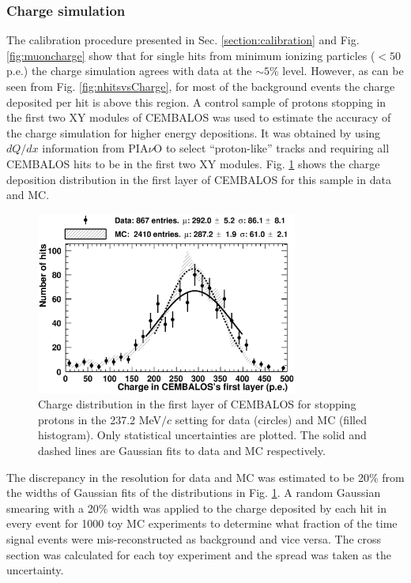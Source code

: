 \subsubsection{\bf Charge simulation}
The calibration procedure presented in Sec. \ref{section:calibration} and Fig. \ref{fig:muoncharge} show that for single hits from minimum ionizing particles ($<50$ p.e.) the charge simulation agrees with data at the $\sim5$\% level. However, as can be seen from Fig. \ref{fig:nhitsvsCharge}, for most of the background events the charge deposited per hit is above this region. A control sample of protons stopping in the first two XY modules of CEMBALOS was used to estimate the accuracy of the charge simulation for higher energy depositions. It was obtained by using $dQ/dx$ information from PIA$\nu$O to select ``proton-like'' tracks and requiring all CEMBALOS hits to be in the first two XY modules. Fig. \ref{fig:proton_sample} shows the charge deposition distribution in the first layer of CEMBALOS for this sample in data and MC.
\begin{figure}[ht]
 \includegraphics[width=86mm]{figures/proton_contained_1stlayer.eps}
 \caption{Charge distribution in the first layer of CEMBALOS for stopping protons in the 237.2 MeV$/c$ setting for data (circles) and MC (filled histogram). Only statistical uncertainties are plotted. The solid and dashed lines are Gaussian fits to data and MC respectively.}
 \label{fig:proton_sample}
\end{figure}

The discrepancy in the resolution for data and MC was estimated to be 20\% from the widths of Gaussian fits of the distributions in Fig. \ref{fig:proton_sample}.
{\color{red}A random Gaussian smearing with a 20\% width was applied to the charge deposited by each hit in every event for 1000 toy MC experiments to determine what fraction of the time signal events were mis-reconstructed as background and vice versa. The cross section was calculated for each toy experiment and the spread was taken as the uncertainty.}

